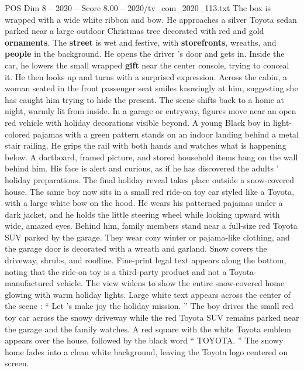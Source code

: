 \begin{textsample}{POS Dim 8 – 2020 – Score 8.00 – 2020/tv\_com\_2020\_113.txt}
The box is wrapped with a wide white ribbon and bow.
He approaches a silver Toyota sedan parked near a large outdoor Christmas tree decorated with red and gold \textbf{ornaments}.
The \textbf{street} is wet and festive, with \textbf{storefronts}, wreaths, and \textbf{people} in the background.
He opens the driver ’s door and gets in.
Inside the car, he lowers the small wrapped \textbf{gift} near the center console, trying to conceal it.
He then looks up and turns with a surprised expression.
Across the cabin, a woman seated in the front passenger seat smiles knowingly at him, suggesting she has caught him trying to hide the present.
The scene shifts back to a home at night, warmly lit from inside.
In a garage or entryway, figures move near an open red vehicle with holiday decorations visible beyond.
A young Black boy in light-colored pajamas with a green pattern stands on an indoor landing behind a metal stair railing.
He grips the rail with both hands and watches what is happening below.
A dartboard, framed picture, and stored household items hang on the wall behind him.
His face is alert and curious, as if he has discovered the adults ’ holiday preparations.
The final holiday reveal takes place outside a snow-covered house.
The same boy now sits in a small red ride-on toy car styled like a Toyota, with a large white bow on the hood.
He wears his patterned pajamas under a dark jacket, and he holds the little steering wheel while looking upward with wide, amazed eyes.
Behind him, family members stand near a full-size red Toyota SUV parked by the garage.
They wear cozy winter or pajama-like clothing, and the garage door is decorated with a wreath and garland.
Snow covers the driveway, shrubs, and roofline.
Fine-print legal text appears along the bottom, noting that the ride-on toy is a third-party product and not a Toyota-manufactured vehicle.
The view widens to show the entire snow-covered home glowing with warm holiday lights.
Large white text appears across the center of the scene : “ Let ’s make joy the holiday mission. ” The boy drives the small red toy car across the snowy driveway while the red Toyota SUV remains parked near the garage and the family watches.
A red square with the white Toyota emblem appears over the house, followed by the black word “ TOYOTA. ” The snowy home fades into a clean white background, leaving the Toyota logo centered on screen.

\end{textsample}
